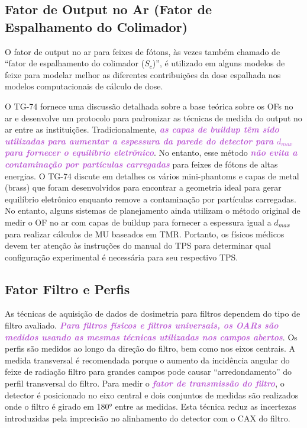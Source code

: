 \documentclass[11pt,a4paper]{article}
\begin{document}
\subsection*{Fator de Output no Ar (Fator de Espalhamento do Colimador)}

	O fator de output no ar para feixes de fótons, às vezes também chamado de “fator de espalhamento do colimador ($S_c$)”, é utilizado em alguns modelos de feixe para modelar melhor as diferentes contribuições da dose espalhada nos modelos computacionais de cálculo de dose. 

	O TG-74 fornece uma discussão detalhada sobre a base teórica sobre os OFs no ar e desenvolve um protocolo para padronizar as técnicas de medida do output no ar entre as instituições. Tradicionalmente, \textcolor{MediumOrchid}{\textbf{\textit{as capas de buildup têm sido utilizadas para aumentar a espessura da parede do detector para $d_{max}$ para fornecer o equilíbrio eletrônico}}}. No entanto, esse método \textcolor{MediumOrchid}{\textbf{\textit{não evita a contaminação por partículas carregadas}}} para feixes de fótons de altas energias. O TG-74 discute em detalhes os vários mini-phantoms e capas de metal (brass) que foram desenvolvidos para encontrar a geometria ideal para gerar equilíbrio eletrônico enquanto remove a contaminação por partículas carregadas. No entanto, alguns sistemas de planejamento ainda utilizam o método original de medir o OF no ar com capas de buildup para fornecer a espessura igual a $d_{max}$ para realizar cálculos de MU baseados em TMR. Portanto, os físicos médicos devem ter atenção às instruções do manual do TPS para determinar qual configuração experimental é necessária para seu respectivo TPS.

\subsection*{Fator Filtro e Perfis}

	As técnicas de aquisição de dados de dosimetria para filtros dependem do tipo de filtro avaliado. \textcolor{MediumOrchid}{\textbf{\textit{Para filtros físicos e filtros universais, os OARs são medidos usando as mesmas técnicas utilizadas nos campos abertos}}}. Os perfis são medidos ao longo da direção do filtro, bem como nos eixos centrais. A medida transversal é recomendada porque o aumento da incidência angular do feixe de radiação filtro para grandes campos pode causar “arredondamento” do perfil transversal do filtro. Para medir o \textcolor{MediumOrchid}{\textbf{\textit{fator de transmissão do filtro}}}, o detector é posicionado no eixo central e dois conjuntos de medidas são realizados onde o filtro é girado em \ang{180} entre as medidas. Esta técnica reduz as incertezas introduzidas pela imprecisão no alinhamento do detector com o CAX do filtro.
\end{document}
